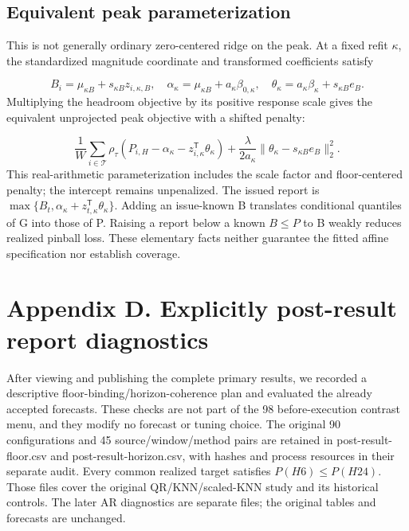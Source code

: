 \documentclass[10pt,a4paper]{article}
\begin{document}
\subsection*{Equivalent peak parameterization}
This is not generally ordinary zero-centered ridge on the peak. At a fixed refit \(\kappa\), the standardized magnitude coordinate and transformed coefficients satisfy

\[
B_i=\mu_{\kappa B}+s_{\kappa B}z_{i,\kappa,B},\quad\alpha_\kappa=\mu_{\kappa B}+a_\kappa\beta_{0,\kappa},\quad\theta_\kappa=a_\kappa\beta_\kappa+s_{\kappa B}e_B.
\]
Multiplying the headroom objective by its positive response scale gives the equivalent unprojected peak objective with a shifted penalty:

\[
\frac1W\sum_{i\in\mathcal T}\rho_\tau(P_{i,H}-\alpha_\kappa-z_{i,\kappa}^{\mathsf T}\theta_\kappa)+\frac{\lambda}{2a_\kappa}\|\theta_\kappa-s_{\kappa B}e_B\|_2^2.
\]
This real-arithmetic parameterization includes the scale factor and floor-centered penalty; the intercept remains unpenalized. The issued report is \(\max\{B_t,\alpha_\kappa+z_{t,\kappa}^{\mathsf T}\theta_\kappa\}\). Adding an issue-known B translates conditional quantiles of G into those of P. Raising a report below a known \(B\le P\) to B weakly reduces realized pinball loss. These elementary facts neither guarantee the fitted affine specification nor establish coverage.

\section*{Appendix D. Explicitly post-result report diagnostics}
After viewing and publishing the complete primary results, we recorded a descriptive floor-binding/horizon-coherence plan and evaluated the already accepted forecasts. These checks are not part of the 98 before-execution contrast menu, and they modify no forecast or tuning choice. The original 90 configurations and 45 source/window/method pairs are retained in post-result-floor.csv and post-result-horizon.csv, with hashes and process resources in their separate audit. Every common realized target satisfies \(P(H6)\le P(H24)\). Those files cover the original QR/KNN/scaled-KNN study and its historical controls. The later AR diagnostics are separate files; the original tables and forecasts are unchanged.
\end{document}
